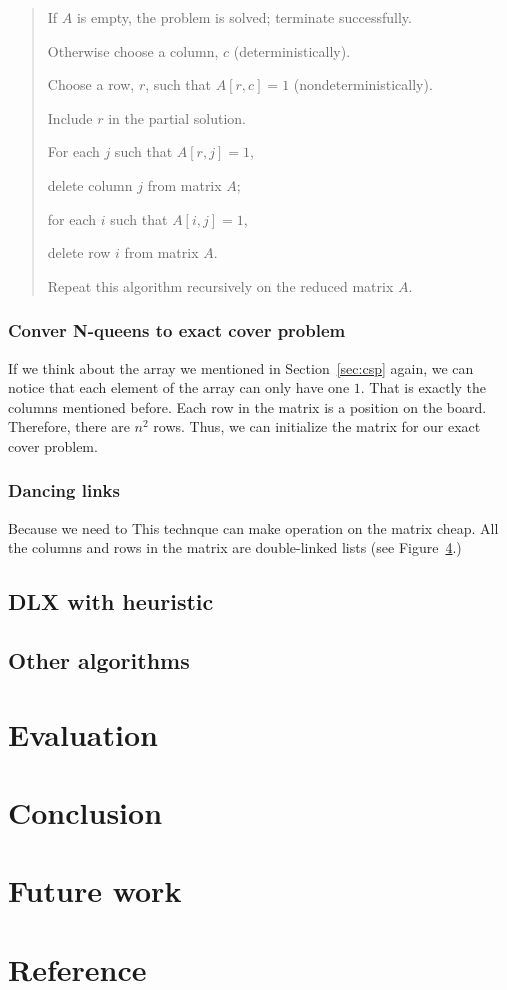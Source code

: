 \begin{quotation}
  If $A$ is empty, the problem is solved; terminate successfully.
  
  Otherwise choose a column, $c$ (deterministically).
  
  Choose a row, $r$, such that $A[r, c] = 1$ (nondeterministically).
  
  Include $r$ in the partial solution.
  
  For each $j$ such that $A[r, j] = 1$,
  
  \indent \indent  delete column $j$ from matrix $A$;
  
  \indent \indent  for each $i$ such that $A[i, j] = 1$,
  
  \indent \indent \indent     delete row $i$ from matrix $A$.
  
  Repeat this algorithm recursively on the reduced matrix $A$.
\end{quotation}

\subsubsection{Conver N-queens to exact cover problem}
If we think about the array we mentioned in Section~\ref{sec:csp} again, we can notice that each element of the array can only have one $1$. That is exactly the columns mentioned before. Each row in the matrix is a position on the board. Therefore, there are $n^2$ rows. Thus, we can initialize the matrix for our exact cover problem.

\subsubsection{Dancing links}\label{sec:dl}
Because we need to This technque can make operation on the matrix cheap. All the columns and rows in the matrix are double-linked lists (see Figure~\ref{}.)

\subsection{DLX with heuristic}

\subsection{Other algorithms}

\section{Evaluation}

\section{Conclusion}

\section{Future work}

\section{Reference}
{}




